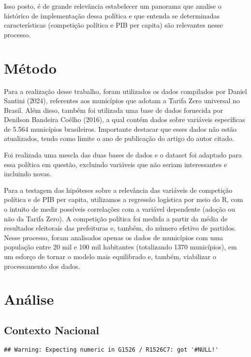 \documentclass[
]{article}
\begin{document}
Isso posto, é de grande relevância estabelecer um panorama que analise o
histórico de implementação dessa política e que entenda se determinadas
características (competição política e PIB per capita) são relevantes
nesse processo.

\section{Método}\label{muxe9todo}

Para a realização desse trabalho, foram utilizados os dados compilados
por Daniel Santini (2024), referentes aos municípios que adotam a Tarifa
Zero universal no Brasil. Além disso, também foi utilizada uma base de
dados fornecida por Denilson Bandeira Coêlho (2016), a qual contém dados
sobre variáveis específicas de 5.564 municípios brasileiros. Importante
destacar que esses dados não estão atualizados, tendo como limite o ano
de publicação do artigo do autor citado.

Foi realizada uma mescla das duas bases de dados e o dataset foi
adaptado para essa política em questão, excluindo variáveis que não
seriam interessantes e incluindo novas.

Para a testagem das hipóteses sobre a relevância das variáveis de
competição política e de PIB per capita, utilizamos a regressão
logística por meio do R, com o intuito de medir possíveis correlações
com a variável dependente (adoção ou não da Tarifa Zero). A competição
política foi medida a partir da média de resultados eleitorais das
prefeituras e, também, do número efetivo de partidos. Nesse processo,
foram analisados apenas os dados de municípios com uma população entre
20 mil e 100 mil habitantes (totalizando 1370 municípios), em um esforço
de tornar o modelo mais equilibrado e, também, viabilizar o
processamento dos dados.

\section{Análise}\label{anuxe1lise}

\subsection{Contexto Nacional}\label{contexto-nacional}

\begin{verbatim}
## Warning: Expecting numeric in G1526 / R1526C7: got '#NULL!'
\end{verbatim}
\end{document}
